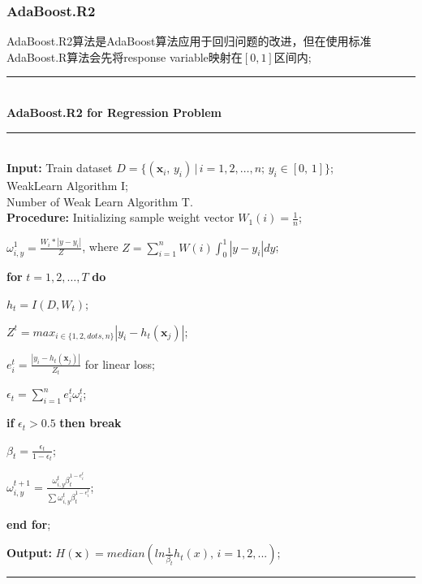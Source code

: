 \documentclass[a4paper]{article}
\begin{document}
		\subsubsection{AdaBoost.R2}

			AdaBoost.R2算法是AdaBoost算法应用于回归问题的改进，但在使用标准AdaBoost.R算法会先将response variable映射在$[0,1]$区间内;\par
			\noindent\rule[0.1\baselineskip]{\textwidth}{0.75pt}\\
			\textbf{AdaBoost.R2 for Regression Problem}\\
			\noindent\rule[0.1\baselineskip]{\textwidth}{0.5pt}\\
			\textbf{Input:} Train dataset $D = \{(\textbf{x}_i,\,y_i)\,|\,i = 1, 2,\dots, n;\, y_i \in [0,\,1]\}$;\\
			\hspace*{32pt} WeakLearn Algorithm I;\\
			\hspace*{32pt} Number of Weak Learn Algorithm T.\\
			\textbf{Procedure:} 
					\hspace*{2pt} Initializing sample weight vector $W_1(i) = \frac{1}{n}$;\par
					\hspace*{36pt}$\omega_{i,y}^1 = \frac{W_i*|y-y_i|}{Z}$, where $Z = \sum_{i=1}^{n}W(i)\int_{0}^{1}|y-y_i|dy$; \par
					\hspace*{32pt} \textbf{for} $t = 1, 2,\dots, T$ \textbf{do}\par
							\hspace*{48pt} $h_t = I(D, W_t)$;\par
							\hspace*{48pt} $Z^t = max_{i \in \{1,2,dots,n\}}|y_i-h_t(\textbf{x}_j)|$;\par
							\hspace*{48pt} $e_i^t = \frac{|y_i-h_t(\textbf{x}_j)|}{Z_t}$ for linear loss;\par
							\hspace*{48pt} $\epsilon_t = \sum_{i=1}^{n}e_i^t\omega_i^t$;\par
							\hspace*{48pt} \textbf{if} $\epsilon_t > 0.5$ \textbf{then break}\par
							\hspace*{48pt} $\beta_t = \frac{\epsilon_t}{1-\epsilon_t}$;\par
							\hspace*{48pt} $\omega_{i,y}^{t+1} = \frac{\omega_{i,y}^{t}\beta_t^{1-e_i^t}}{\sum{\omega_{i,y}^{t}\beta_t^{1-e_i^t}}}$;\par
					\hspace*{32pt}\textbf{end for};\par
			\textbf{Output:} $H(\textbf{x}) = median({ln\frac{1}{\beta_t}h_t(x),\,i=1,2,...})$;\par
			\noindent\rule[0.1\baselineskip]{\textwidth}{0.75pt}
\end{document}
